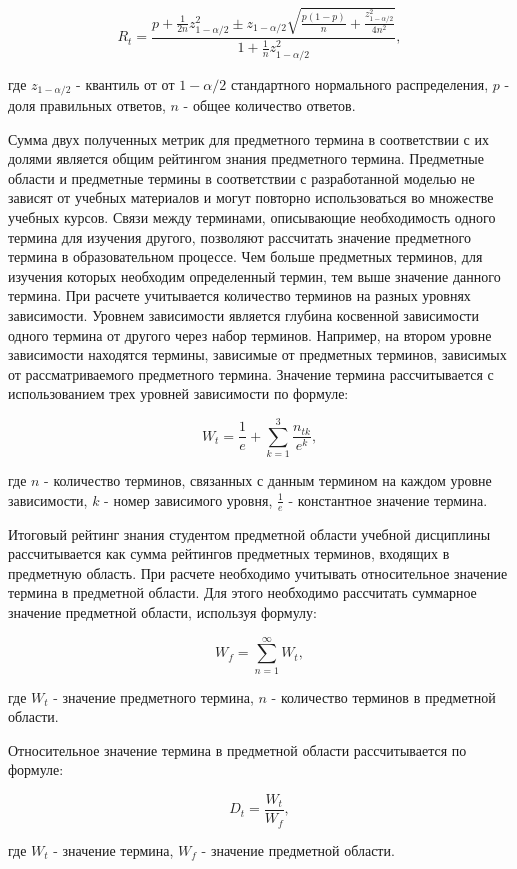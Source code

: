 $$
    R_t = \frac{p+\frac{1}{2n}z_{1-\alpha/2}^2 \pm z_{1-\alpha/2}\sqrt{\frac{p(1-p)}{n}+\frac{z_{1-\alpha/2}^2}{4n^2}}{} }{1+\frac{1}{n}z_{1-\alpha/2}^2},
$$

где \(z_{1-\alpha/2}\) - квантиль от от \(1-\alpha/2\) стандартного нормального распределения, \(p\) - доля правильных ответов, \(n\) - общее количество ответов. 

Сумма двух полученных метрик для предметного термина в соответствии с их долями является общим рейтингом знания предметного термина. Предметные области и предметные термины в соответствии с разработанной моделью не зависят от учебных материалов и могут повторно использоваться во множестве учебных курсов. Связи между терминами, описывающие необходимость одного термина для изучения другого, позволяют рассчитать значение предметного термина в образовательном процессе. Чем больше предметных терминов, для изучения которых необходим определенный термин, тем выше значение данного термина. При расчете учитывается количество терминов на разных уровнях зависимости. Уровнем зависимости является глубина косвенной зависимости одного термина от другого через набор терминов. Например, на втором уровне зависимости находятся термины, зависимые от предметных терминов, зависимых от рассматриваемого предметного термина. Значение термина рассчитывается с использованием трех уровней зависимости по формуле: 

$$
    W_t = \frac{1}{e}+\sum_{k=1}^{3}\frac{n_{tk}}{e^k}, 
$$

где \(n\) - количество терминов, связанных с данным термином на каждом уровне зависимости, \(k\) - номер зависимого уровня, \( \frac{1}{e} \) - константное значение термина. 

Итоговый рейтинг знания студентом предметной области учебной дисциплины рассчитывается как сумма рейтингов предметных терминов, входящих в предметную область. При расчете необходимо учитывать относительное значение термина в предметной области. Для этого необходимо рассчитать суммарное значение предметной области, используя формулу:

$$  
    W_f = \sum_{n=1}^{\infty}W_t,
$$

где \(W_t\) - значение предметного термина, \(n\) - количество терминов в предметной области.

Относительное значение термина в предметной области рассчитывается по формуле:

$$
    D_t = \frac{W_t}{W_f},
$$

где \(W_t\) - значение термина, \(W_f\) - значение предметной области.

